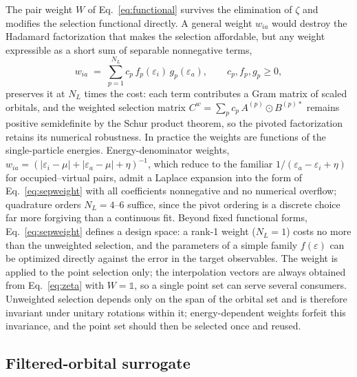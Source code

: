 \documentclass[aps,prb,twocolumn,superscriptaddress,amsmath,amssymb]{revtex4-2}
\begin{document}
The pair weight $W$ of Eq.~\eqref{eq:functional} survives the elimination of
$\zeta$ and modifies the selection functional directly. A general weight
$w_{ia}$ would destroy the Hadamard factorization that makes the selection
affordable, but any weight expressible as a short sum of separable
nonnegative terms,
\begin{equation}
  w_{ia} \;=\; \sum_{p=1}^{N_L} c_p\, f_p(\varepsilon_i)\, g_p(\varepsilon_a),
  \qquad c_p, f_p, g_p \ge 0,
  \label{eq:sepweight}
\end{equation}
preserves it at $N_L$ times the cost: each term contributes a Gram matrix of
scaled orbitals, and the weighted selection matrix
$C^{w} = \sum_p c_p\, A^{(p)} \odot B^{(p)*}$ remains positive semidefinite
by the Schur product theorem, so the pivoted factorization retains its
numerical robustness. In practice the weights are functions of the
single-particle energies. Energy-denominator weights,
$w_{ia} = (|\varepsilon_i - \mu| + |\varepsilon_a - \mu| + \eta)^{-1}$,
which reduce to the familiar $1/(\varepsilon_a-\varepsilon_i+\eta)$ for
occupied--virtual pairs, admit a Laplace expansion into the form of
Eq.~\eqref{eq:sepweight} with all coefficients nonnegative and no numerical
overflow; quadrature orders $N_L = 4$--$6$ suffice, since the pivot ordering
is a discrete choice far more forgiving than a continuous fit. Beyond fixed
functional forms, Eq.~\eqref{eq:sepweight} defines a design space: a rank-1
weight ($N_L = 1$) costs no more than the unweighted selection, and the
parameters of a simple family $f(\varepsilon)$ can be optimized directly
against the error in the target observables. The weight is applied to the
point selection only; the interpolation vectors are always obtained from
Eq.~\eqref{eq:zeta} with $W = \mathbb{1}$, so a single point set can serve
several consumers. Unweighted selection depends only on the span of the
orbital set and is therefore invariant under unitary rotations within it;
energy-dependent weights forfeit this invariance, and the point set should
then be selected once and reused.

\subsection{Filtered-orbital surrogate}
\label{sec:knob2}
\end{document}
